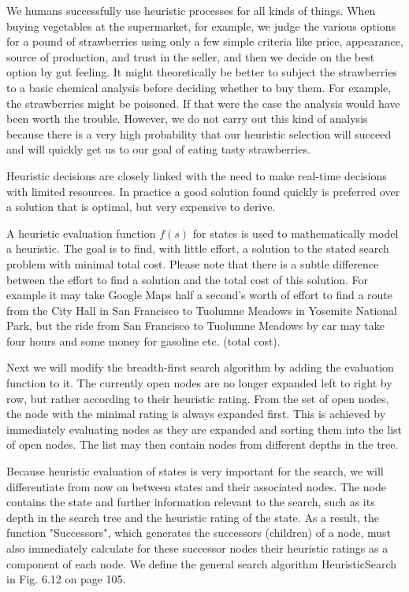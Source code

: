 \documentclass[10pt]{article}
\begin{document}
We humans successfully use heuristic processes for all kinds of things. When buying vegetables at the supermarket, for example, we judge the various options for a pound of strawberries using only a few simple criteria like price, appearance, source of production, and trust in the seller, and then we decide on the best option by gut feeling. It might theoretically be better to subject the strawberries to a basic chemical analysis before deciding whether to buy them. For example, the strawberries might be poisoned. If that were the case the analysis would have been worth the trouble. However, we do not carry out this kind of analysis because there is a very high probability that our heuristic selection will succeed and will quickly get us to our goal of eating tasty strawberries.

Heuristic decisions are closely linked with the need to make real-time decisions with limited resources. In practice a good solution found quickly is preferred over a solution that is optimal, but very expensive to derive.

A heuristic evaluation function $f(s)$ for states is used to mathematically model a heuristic. The goal is to find, with little effort, a solution to the stated search problem with minimal total cost. Please note that there is a subtle difference between the effort to find a solution and the total cost of this solution. For example it may take Google Maps half a second's worth of effort to find a route from the City Hall in San Francisco to Tuolumne Meadows in Yosemite National Park, but the ride from San Francisco to Tuolumne Meadows by car may take four hours and some money for gasoline etc. (total cost).

Next we will modify the breadth-first search algorithm by adding the evaluation function to it. The currently open nodes are no longer expanded left to right by row, but rather according to their heuristic rating. From the set of open nodes, the node with the minimal rating is always expanded first. This is achieved by immediately evaluating nodes as they are expanded and sorting them into the list of open nodes. The list may then contain nodes from different depths in the tree.

Because heuristic evaluation of states is very important for the search, we will differentiate from now on between states and their associated nodes. The node contains the state and further information relevant to the search, such as its depth in the search tree and the heuristic rating of the state. As a result, the function "Successors", which generates the successors (children) of a node, must also immediately calculate for these successor nodes their heuristic ratings as a component of each node. We define the general search algorithm HeuristicSearch in Fig. 6.12 on page 105.
\end{document}
